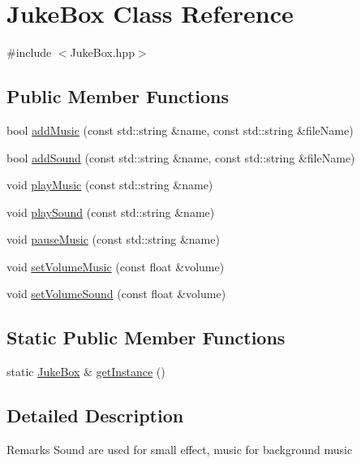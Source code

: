 \hypertarget{class_juke_box}{}\section{Juke\+Box Class Reference}
\label{class_juke_box}


{\ttfamily \#include $<$Juke\+Box.\+hpp$>$}

\subsection*{Public Member Functions}
\begin{DoxyCompactItemize}
\item 
bool \mbox{\hyperlink{class_juke_box_aea5ad553ffb92d934213501929e653a2}{add\+Music}} (const std\+::string \&name, const std\+::string \&file\+Name)
\item 
bool \mbox{\hyperlink{class_juke_box_a889972d76d4c3363d072fd4f66ced001}{add\+Sound}} (const std\+::string \&name, const std\+::string \&file\+Name)
\item 
void \mbox{\hyperlink{class_juke_box_a0c813afba79204a479c7606809352031}{play\+Music}} (const std\+::string \&name)
\item 
void \mbox{\hyperlink{class_juke_box_a6b440cfeb70a1ab8e24185c9d024fd5f}{play\+Sound}} (const std\+::string \&name)
\item 
void \mbox{\hyperlink{class_juke_box_a0893749f1d5a93edbc1ce1e6eb85131a}{pause\+Music}} (const std\+::string \&name)
\item 
void \mbox{\hyperlink{class_juke_box_a349531586d25c156c5d3829214b30ee3}{set\+Volume\+Music}} (const float \&volume)
\item 
void \mbox{\hyperlink{class_juke_box_a7bf0efbd2d9e35361a345ebeafcfcb08}{set\+Volume\+Sound}} (const float \&volume)
\end{DoxyCompactItemize}
\subsection*{Static Public Member Functions}
\begin{DoxyCompactItemize}
\item 
static \mbox{\hyperlink{class_juke_box}{Juke\+Box}} \& \mbox{\hyperlink{class_juke_box_a11fd5183a9697afbdfa4972cc86d5fda}{get\+Instance}} ()
\end{DoxyCompactItemize}


\subsection{Detailed Description}
\begin{DoxyRemark}{Remarks}
Sound are used for small effect, music for background music 
\end{DoxyRemark}


